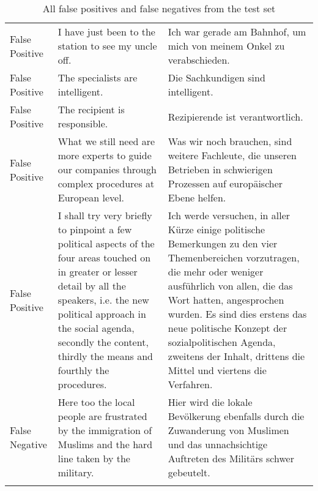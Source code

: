 \begin{longtable}{|l|p{6cm}|p{6cm}|}
False Positive & I have just been to the station to see my uncle off. & Ich war gerade am Bahnhof, um mich von meinem Onkel zu verabschieden. \\
False Positive & The specialists are intelligent. & Die Sachkundigen sind intelligent. \\
False Positive & The recipient is responsible. & Rezipierende ist verantwortlich. \\
False Positive & What we still need are more experts to guide our companies through complex procedures at European level. & Was wir noch brauchen, sind weitere Fachleute, die unseren Betrieben in schwierigen Prozessen auf europäischer Ebene helfen. \\
False Positive & I shall try very briefly to pinpoint a few political aspects of the four areas touched on in greater or lesser detail by all the speakers, i.e. the new political approach in the social agenda, secondly the content, thirdly the means and fourthly the procedures. & Ich werde versuchen, in aller Kürze einige politische Bemerkungen zu den vier Themenbereichen vorzutragen, die mehr oder weniger ausführlich von allen, die das Wort hatten, angesprochen wurden. Es sind dies erstens das neue politische Konzept der sozialpolitischen Agenda, zweitens der Inhalt, drittens die Mittel und viertens die Verfahren. \\
False Negative & Here too the local people are frustrated by the immigration of Muslims and the hard line taken by the military. & Hier wird die lokale Bevölkerung ebenfalls durch die Zuwanderung von Muslimen und das unnachsichtige Auftreten des Militärs schwer gebeutelt. \\
\hline
\caption{All false positives and false negatives from the test set}
\end{longtable}
